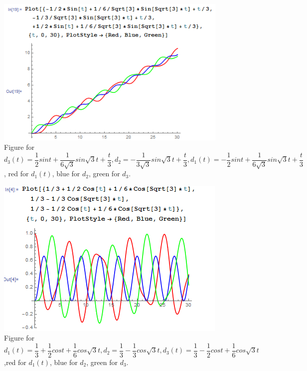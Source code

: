 \documentclass[a4paper,12pt,titlepage]{article}
\begin{document}
\begin{figure}[H]
    \centering
    \includegraphics[width=13
    cm]{59.png}
    \caption{Figure for $d_3
    (t)=\dfrac{1}{2}sint+\dfrac{1}{6\sqrt{3}}sin\sqrt{3}t+\dfrac{t}{3},d_2=-\dfrac{1}{3\sqrt{3}}sin\sqrt{3}t+\dfrac{t}{3},d_1(t)=-\dfrac{1}{2}sint+\dfrac{1}{6\sqrt{3}}sin\sqrt{3}t+\dfrac{t}{3}$, red for $d_1(t)$, blue for $d_2$, green for $d_3$.}
\end{figure}

\begin{figure}[H]
    \centering
    \includegraphics[width=11
    cm]{51.png}
    \caption{Figure for $d_1(t)=\dfrac{1}{3}+\dfrac{1}{2}cost+\dfrac{1}{6}cos\sqrt{3}t,d_2=\dfrac{1}{3}-\dfrac{1}{3}cos\sqrt{3}t,d_3(t)=\dfrac{1}{3}-\dfrac{1}{2}cost+\dfrac{1}{6}cos\sqrt{3}t$,red for $d_1(t)$, blue for $d_2$, green for $d_3$.}
\end{figure}
\end{document}
